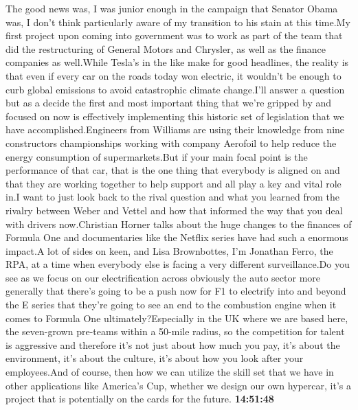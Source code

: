 \documentclass{article}%
\begin{document}
The good news was, I was junior enough in the campaign that Senator Obama was, I don't think particularly aware of my transition to his stain at this time.My first project upon coming into government was to work as part of the team that did the restructuring of General Motors and Chrysler, as well as the finance companies as well.While Tesla's in the like make for good headlines, the reality is that even if every car on the roads today won electric, it wouldn't be enough to curb global emissions to avoid catastrophic climate change.I'll answer a question but as a decide the first and most important thing that we're gripped by and focused on now is effectively implementing this historic set of legislation that we have accomplished.Engineers from Williams are using their knowledge from nine constructors championships working with company Aerofoil to help reduce the energy consumption of supermarkets.But if your main focal point is the performance of that car, that is the one thing that everybody is aligned on and that they are working together to help support and all play a key and vital role in.I want to just look back to the rival question and what you learned from the rivalry between Weber and Vettel and how that informed the way that you deal with drivers now.Christian Horner talks about the huge changes to the finances of Formula One and documentaries like the Netflix series have had such a enormous impact.A lot of sides on keen, and Lisa Brownbottes, I'm Jonathan Ferro, the RPA, at a time when everybody else is facing a very different surveillance.Do you see as we focus on our electrification across obviously the auto sector more generally that there's going to be a push now for F1 to electrify into and beyond the E series that they're going to see an end to the combustion engine when it comes to Formula One ultimately?Especially in the UK where we are based here, the seven{-}grown pre{-}teams within a 50{-}mile radius, so the competition for talent is aggressive and therefore it's not just about how much you pay, it's about the environment, it's about the culture, it's about how you look after your employees.And of course, then how we can utilize the skill set that we have in other applications like America's Cup, whether we design our own hypercar, it's a project that is potentially on the cards for the future.%
\textbf{14:51:48}%
\newline%
\end{document}
